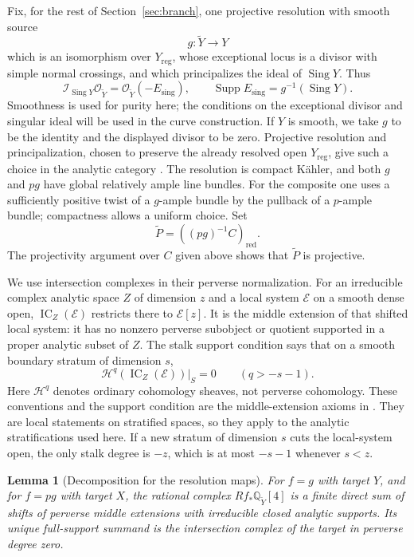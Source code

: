 \documentclass[11pt]{amsart}
\newtheorem{lemma}[theorem]{Lemma}
\theoremstyle{definition}
\theoremstyle{remark}
\numberwithin{equation}{section}
\newcommand{\Q}{\mathbb{Q}}
\DeclareMathOperator{\Supp}{Supp}
\DeclareMathOperator{\Sing}{Sing}
\DeclareMathOperator{\IC}{IC}
\begin{document}
Fix, for the rest of Section~\ref{sec:branch}, one projective
resolution with smooth source
\[
 g\colon\widetilde Y\longrightarrow Y
\]
which is an isomorphism over $Y_{\mathrm{reg}}$, whose exceptional
locus is a divisor with simple normal crossings, and which principalizes
the ideal of $\Sing Y$.  Thus
\[
 \mathcal I_{\Sing Y}\mathcal O_{\widetilde Y}
       =\mathcal O_{\widetilde Y}(-E_{\mathrm{sing}}),
 \qquad
 \Supp E_{\mathrm{sing}}=g^{-1}(\Sing Y).
\]
Smoothness is used for purity here; the conditions on the exceptional
divisor and singular ideal will be used in the curve construction.
If $Y$ is smooth, we take $g$ to be the identity and the displayed
divisor to be zero.  Projective resolution and principalization, chosen
to preserve the already resolved open $Y_{\mathrm{reg}}$, give such a
choice in the analytic category
\cite[Theorems~1.10, 12.2, and 13.2(1)]{BierstoneMilman1997}.  The resolution is compact
K\"ahler, and both $g$ and $pg$ have global relatively ample line
bundles.  For the composite one uses a sufficiently positive twist
of a $g$-ample bundle by the pullback of a $p$-ample bundle; compactness
allows a uniform choice.  Set
\[
 \widetilde P=((pg)^{-1}C)_{\mathrm{red}}.
\]
The projectivity argument over $C$ given above shows that
$\widetilde P$ is projective.

We use intersection complexes in their perverse normalization.  For
an irreducible complex analytic space $Z$ of dimension $z$ and a local
system $\mathcal E$ on a smooth dense open, $\IC_Z(\mathcal E)$
restricts there to $\mathcal E[z]$.  It is the middle extension of
that shifted local system: it has no nonzero perverse subobject or
quotient supported in a proper analytic subset of $Z$.  The stalk
support condition says that on a smooth boundary stratum of dimension
$s$,
\begin{equation}\label{eq:branch-ic-stalk-bound}
 \mathcal H^q(\IC_Z(\mathcal E))|_S=0\qquad(q>-s-1).
\end{equation}
Here $\mathcal H^q$ denotes ordinary cohomology sheaves, not perverse
cohomology.  These conventions and the support condition are the
middle-extension axioms in
\cite[Section~2.3 and Section~3.3, Axiom {\rm[AX1]}(c)]{GoreskyMacPhersonIHII}.
They are local statements on stratified spaces, so they apply to the
analytic stratifications used here.  If a new stratum of dimension $s$
cuts the local-system open, the only stalk degree is $-z$, which is
at most $-s-1$ whenever $s<z$.

\begin{lemma}[Decomposition for the resolution maps]
\label{lem:branch-analytic-decomposition}
For $f=g$ with target $Y$, and for $f=pg$ with target $X$, the rational
complex $Rf_*\Q_{\widetilde Y}[4]$ is a finite direct sum of shifts of
perverse middle extensions with irreducible closed analytic supports.
Its unique full-support summand is the intersection complex of the
target in perverse degree zero.
\end{lemma}
\end{document}
